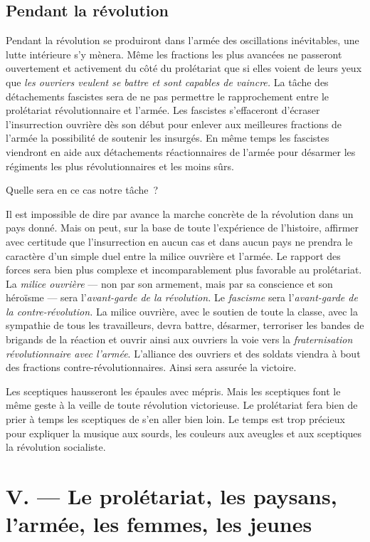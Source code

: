 \documentclass[french,twoside]{book} %
\begin{document}
\subsection[{Pendant la révolution}]{Pendant la révolution}
\noindent Pendant la révolution se produiront dans l’armée des oscillations inévitables, une lutte intérieure s’y mènera. Même les fractions les plus avancées ne passeront ouvertement et activement du côté du prolétariat que si elles voient de leurs yeux que \emph{les ouvriers veulent se battre et sont capables de vaincre.} La tâche des détachements fascistes sera de ne pas permettre le rapprochement entre le prolétariat révolutionnaire et l’armée. Les fascistes s’effaceront d’écraser l’insurrection ouvrière dès son début pour enlever aux meilleures fractions de l’armée la possibilité de soutenir les insurgés. En même temps les fascistes viendront en aide aux détachements réactionnaires de l’armée pour désarmer les régiments les plus révolutionnaires et les moins sûrs.\par
 Quelle sera en ce cas notre tâche ?\par
Il est impossible de dire par avance la marche concrète de la révolution dans un pays donné. Mais on peut, sur la base de toute l’expérience de l’histoire, affirmer avec certitude que l’insurrection en aucun cas et dans aucun pays ne prendra le caractère d’un simple duel entre la milice ouvrière et l’armée. Le rapport des forces sera bien plus complexe et incomparablement plus favorable au prolétariat. La \emph{milice ouvrière} — non par son armement, mais par sa conscience et son héroïsme — sera l’\emph{avant-garde de la révolution.} Le \emph{fascisme} sera l’\emph{avant-garde de la contre-révolution.} La milice ouvrière, avec le soutien de toute la classe, avec la sympathie de tous les travailleurs, devra battre, désarmer, terroriser les bandes de brigands de la réaction et ouvrir ainsi aux ouvriers la voie vers la \emph{fraternisation révolutionnaire avec l’armée}. L’alliance des ouvriers et des soldats viendra à bout des fractions contre-révolutionnaires. Ainsi sera assurée la victoire.\par
Les sceptiques hausseront les épaules avec mépris. Mais les sceptiques font le même geste à la veille de toute révolution victorieuse. Le prolétariat fera bien de prier à temps les sceptiques de s’en aller bien loin. Le temps est trop précieux pour expliquer la musique aux sourds, les couleurs aux aveugles et aux sceptiques la révolution socialiste.
\section[{V. — Le prolétariat, les paysans, l’armée, les femmes, les jeunes}]{V. — Le prolétariat, les paysans, l’armée, les femmes, les jeunes}
\end{document}
